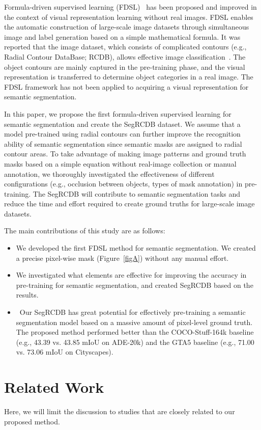\documentclass[10pt,twocolumn,letterpaper]{article}
\begin{document}
 Formula-driven supervised learning (FDSL)~\cite{Kataoka_2022_IJCV} has been proposed and improved in the context of visual representation learning without real images.
 FDSL enables the automatic construction of large-scale image datasets through simultaneous image and label generation based on a simple mathematical formula.
 It was reported that the image dataset, which consists of complicated contours (e.g., Radial Contour DataBase; RCDB), allows effective image classification~\cite{Kataoka_2022_CVPR}.
 The object contours are mainly captured in the pre-training phase, and the visual representation is transferred to determine object categories in a real image.
 The FDSL framework has not been applied to acquiring a visual representation for semantic segmentation. 

 In this paper, we propose the first formula-driven supervised learning for semantic segmentation and create
 the SegRCDB dataset.
 We assume that a model pre-trained using radial contours can further improve the recognition ability of semantic segmentation since semantic masks are assigned to radial contour areas.  
To take advantage of making image patterns and ground truth masks based on a simple equation without real-image collection or manual annotation, we thoroughly investigated the effectiveness of different configurations (e.g., occlusion between objects, types of mask annotation) in pre-training.
The SegRCDB will contribute to semantic segmentation tasks and reduce the time and effort required to create ground truths for large-scale image datasets.

The main contributions of this study are as follows:
\begin{itemize}
    \item We developed the first FDSL method for semantic segmentation. 
    We created a precise pixel-wise mask (Figure~\ref{figA}) without any manual effort. 
    \item We investigated what elements are effective for improving the accuracy in pre-training for semantic segmentation, and created SegRCDB based on the results.
    \item  Our SegRCDB has great potential for effectively pre-training a semantic segmentation model based on a massive amount of pixel-level ground truth. The proposed method performed better than the COCO-Stuff-164k baseline (e.g., 43.39 vs. 43.85 mIoU on ADE-20k) and the GTA5 baseline (e.g., 71.00 vs. 73.06 mIoU on Cityscapes).
\end{itemize}
\section{Related Work}
\label{sec:relatedwork} 
Here, we will limit the discussion to studies that are closely related to our proposed method.
\end{document}
